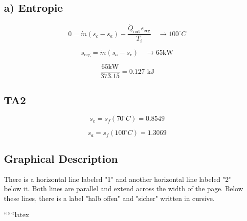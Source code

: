 \subsection*{a) Entropie}

\[
0 = \dot{m} (s_c - s_a) + \frac{\dot{Q}_{\text{out}} s_{\text{erg}}}{T_i} \quad \rightarrow 100^\circ C
\]

\[
s_{\text{erg}} = \dot{m} (s_a - s_e) \quad \rightarrow 65 \text{kW}
\]

\[
\frac{65 \text{kW}}{373.15} = 0.127 \text{ kJ}
\]

\subsection*{TA2}

\[
s_e = s_f (70^\circ C) = 0.8549
\]

\[
s_a = s_f (100^\circ C) = 1.3069
\]

\subsection*{Graphical Description}

There is a horizontal line labeled "1" and another horizontal line labeled "2" below it. Both lines are parallel and extend across the width of the page. Below these lines, there is a label "halb offen" and "sicher" written in cursive.

``````latex
